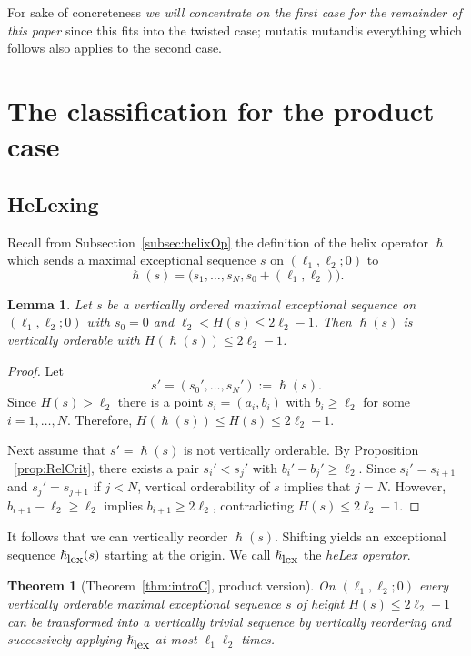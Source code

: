 \documentclass[11pt]{article}
\newtheorem{theorem}[theo]{Theorem}
\newtheorem{lemma}[theo]{Lemma}
\theoremstyle{definition}
\numberwithin{equation}{section}
\newcommand{\cl}{s}
\newcommand{\mes}{maximal exceptional sequence}
\newcommand{\helix}{\hslash}
\newcommand{\heLex}{\helix_{\mbox{\tiny lex}}}
\newcommand{\ssect}[1]{Subsection~\ref{#1}}
\newcommand{\thHelex}{\ref{thm:introC}}
\begin{document}
For sake of concreteness {\em we will 
concentrate on the first case for the remainder 
of this paper} since this fits into the twisted case; 
mutatis mutandis everything which follows also 
applies to the second case.

\section{The classification for the 
product case}
\label{sec:ClassPC}
\subsection{HeLexing}
\label{subsec:HeLexPC}
Recall from \ssect{subsec:helixOp}
the definition of the helix operator 
$\helix$ which sends a {\mes} $\cl$ on 
$(\ell_1,\ell_2;0)$ to
$$
\helix(\cl)=\big(\cl_1,\ldots,\cl_N,\cl_0+
(\ell_1,\ell_2)\big).
$$

\begin{lemma}
Let $\cl$ be a vertically ordered {\mes} on 
$(\ell_1,\ell_2;0)$ with $\cl_0=0$ and 
$\ell_2<H(\cl)\leq2\ell_2-1$. Then $\helix(\cl)$ 
is vertically orderable with $H(\helix(\cl))\leq2\ell_2-1$.
\end{lemma}

\begin{proof}
Let
$$
\cl'=(\cl_0',\ldots,\cl_N'):=\helix(\cl).
$$
Since $H(\cl)>\ell_2$ there is a point 
$\cl_i=(a_i,b_i)$ with $b_i\geq\ell_2$ for 
some $i=1,\ldots,N$. Therefore, $H(\helix(\cl))
\leq H(\cl)\leq2\ell_2-1$.

Next assume that $\cl'=\helix(\cl)$ is not
vertically orderable. By Proposition
~\ref{prop:RelCrit}, there exists a pair 
$\cl_i'<\cl_j'$ with $b_i'-b_j'\geq\ell_2$. 
Since $\cl_i'=\cl_{i+1}$ and $\cl_j'=\cl_{j+1}$ 
if $j<N$, vertical orderability of $\cl$ 
implies that $j=N$. However, 
$b_{i+1}-\ell_2\geq\ell_2$ implies 
$b_{i+1}\geq2\ell_2$, contradicting 
$H(\cl)\leq2\ell_2-1$.
\end{proof}

It follows that we can vertically reorder 
$\helix(\cl)$. Shifting yields an exceptional
sequence $\heLex(\cl)$ starting at the origin.
We call $\heLex$ the {\em heLex operator}.

\begin{theorem}[Theorem~\thHelex, product version]
\label{thm:HeLexingPC}
On $(\ell_1,\ell_2;0)$ every vertically 
orderable {\mes} $\cl$ of height 
$H(\cl)\leq 2\ell_2-1$ can be transformed 
into a vertically trivial sequence by 
vertically reordering and successively 
applying $\heLex$ 
at most $\ell_1\ell_2$ times.
\end{theorem}
\end{document}
